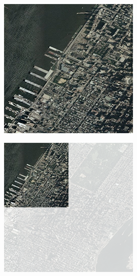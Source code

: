 \begin{figure}[htbp]
    \centering
    \begin{subfigure}[t]{0.3\textwidth}
        \includegraphics[width=\textwidth]{figures/implementation/chunktile/chunktilepile3.png}
    \end{subfigure}
    \quad
    \begin{subfigure}[t]{0.3\textwidth}
        \includegraphics[width=\textwidth]{figures/implementation/chunktile/chunktilepile2.png}

\end{subfigure}
\end{figure}
